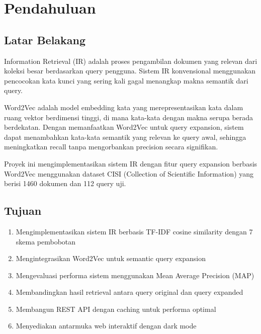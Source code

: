 \documentclass[12pt,a4paper]{report}
\begin{document}
\newpage
\tableofcontents
\newpage
\chapter{Pendahuluan}

\section{Latar Belakang}
Information Retrieval (IR) adalah proses pengambilan dokumen yang relevan dari koleksi besar berdasarkan query pengguna. Sistem IR konvensional menggunakan pencocokan kata kunci yang sering kali gagal menangkap makna semantik dari query.

Word2Vec adalah model embedding kata yang merepresentasikan kata dalam ruang vektor berdimensi tinggi, di mana kata-kata dengan makna serupa berada berdekatan. Dengan memanfaatkan Word2Vec untuk query expansion, sistem dapat menambahkan kata-kata semantik yang relevan ke query awal, sehingga meningkatkan recall tanpa mengorbankan precision secara signifikan.

Proyek ini mengimplementasikan sistem IR dengan fitur query expansion berbasis Word2Vec menggunakan dataset CISI (Collection of Scientific Information) yang berisi 1460 dokumen dan 112 query uji.

\section{Tujuan}
\begin{enumerate}
    \item Mengimplementasikan sistem IR berbasis TF-IDF cosine similarity dengan 7 skema pembobotan
    \item Mengintegrasikan Word2Vec untuk semantic query expansion
    \item Mengevaluasi performa sistem menggunakan Mean Average Precision (MAP)
    \item Membandingkan hasil retrieval antara query original dan query expanded
    \item Membangun REST API dengan caching untuk performa optimal
    \item Menyediakan antarmuka web interaktif dengan dark mode
\end{enumerate}
\end{document}
